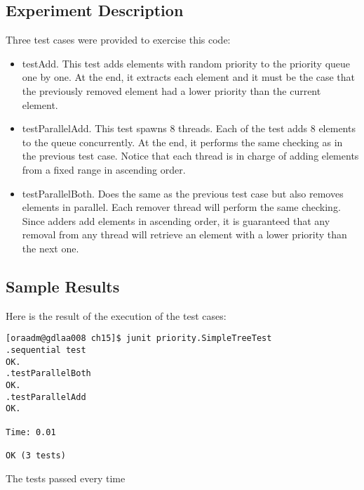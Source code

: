\subsection{Experiment Description}
\par
Three test cases were provided to exercise this code:
\begin{itemize}
\item testAdd. This test adds elements with random priority to the priority
queue one by one. At the end, it extracts each element and it must be the case
that the previously removed element had a lower priority than the current
element. 
\item testParallelAdd. This test spawns 8 threads. Each of the test adds 8
elements to the queue concurrently. At the end, it performs the same checking as
in the previous test case. Notice that each thread is in charge of adding
elements from a fixed range in ascending order.
\item testParallelBoth. Does the same as the previous test case but also removes
elements in parallel. Each remover thread will perform the same checking. Since
adders add elements in ascending order, it is guaranteed that any removal from
any thread will retrieve an element with a lower priority than the next one.
\end{itemize}
\par
\subsection{Sample Results}
\par
Here is the result of the execution of the test cases:
\par
\hfill
\begin{verbatim}
[oraadm@gdlaa008 ch15]$ junit priority.SimpleTreeTest
.sequential test
OK.
.testParallelBoth
OK.
.testParallelAdd
OK.

Time: 0.01

OK (3 tests)
\end{verbatim}
\hfill
\par
The tests passed every time
